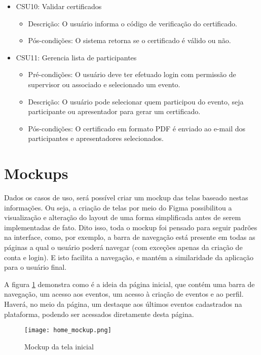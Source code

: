 \begin{itemize}
\begin{itemize}
        \end{itemize}
    \item CSU10: Validar certificados
        \begin{itemize}
            \item Descrição: O usuário informa o código de verificação do certificado.
            \item Pós-condições: O sistema retorna se o certificado é válido ou não.
        \end{itemize}
    \item CSU11: Gerencia lista de participantes
        \begin{itemize}
            \item Pré-condições: O usuário deve ter efetuado login com permissão de supervisor ou associado e selecionado um evento.
            \item Descrição: O usuário pode selecionar quem participou do evento, seja participante ou apresentador para gerar um certificado.
            \item Pós-condições: O certificado em formato PDF é enviado ao e-mail dos participantes e apresentadores selecionados.
        \end{itemize}
        
\end{itemize}

\section{Mockups}
Dados os casos de uso, será possível criar um mockup das telas baseado nestas informações. Ou seja, a criação de telas por meio do Figma possibilitou a visualização e alteração do layout de uma forma simplificada antes de serem implementadas de fato. Dito isso, toda o mockup foi pensado para seguir padrões na interface, como, por exemplo, a barra de navegação está presente em todas as páginas a qual o usuário poderá navegar (com exceções apenas da criação de conta e login). E isto facilita a navegação, e mantém a similaridade da aplicação para o usuário final.  

A figura \ref{home_mockup} demonstra como é a ideia da página inicial, que contém uma barra de navegação, um acesso aos eventos, um acesso à criação de eventos e ao perfil. Haverá, no meio da página, um destaque aos últimos eventos cadastrados na plataforma, podendo ser acessados diretamente desta página.
\begin{figure}[H]
    \caption{\label{home_mockup}Mockup da tela inicial}
    \vspace{5pt}
    \centering
    \texttt{[image: home\_mockup.png]}
    \vspace{5pt}
\end{figure}

